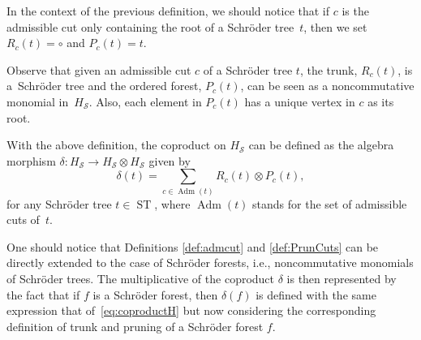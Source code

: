 \documentclass[11pt]{article}
\numberwithin{equation}{section}
\numberwithin{equation}{section}
\newcommand{\ST}{\operatorname{ST}}
\newcommand{\cHS}{H_\mathcal{S}}
\begin{document}
\begin{Remark}In the context of the previous definition, we should notice that if $c$ is the admissible cut only containing the root of a Schr\"oder tree~$t$, then we set~$R_c(t) = \circ$ and $P_c(t) = t$.
\end{Remark}

\begin{Remark}Observe that given an admissible cut $c$ of a Schr\"oder tree $t$, the trunk, $R_c(t)$, is a~Schr\"oder tree and the ordered forest, $P_c(t)$, can be seen as a noncommutative monomial in~$\cHS$. Also, each element in $P_c(t)$ has a unique vertex in $c$ as its root.
\end{Remark}

With the above definition, the coproduct on $\cHS$ can be defined as the algebra morphism $\delta\colon \cHS\to \cHS\otimes \cHS$ given by
\begin{equation}\label{eq:coproductH}
	\delta(t) = \sum_{c \in \operatorname{Adm}(t)} R_c(t)\otimes P_c(t),
\end{equation}
for any Schr\"oder tree $t \in \ST$, where $\operatorname{Adm}(t)$ stands for the set of admissible cuts of~$t$.

\begin{Remark}
One should notice that Definitions \ref{def:admcut} and \ref{def:PrunCuts} can be directly extended to the case of Schr\"oder forests, i.e., noncommutative monomials of Schr\"oder trees. The multiplicative of the coproduct $\delta$ is then represented by the fact that if $f$ is a Schr\"oder forest, then $\delta(f)$ is defined with the same expression that of~\eqref{eq:coproductH} but now considering the corresponding definition of trunk and pruning of a Schr\"oder forest $f$.
\end{Remark}
\end{document}
